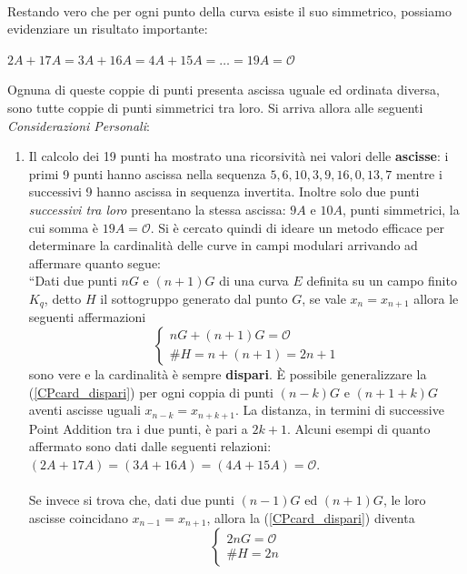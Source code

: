 \documentclass[a4paper,12pt]{tesiinfo}
\begin{document}
\\
Restando vero che per ogni punto della curva esiste il suo simmetrico, possiamo evidenziare un risultato importante:
\begin{center}
 $2A + 17A = 3A + 16A = 4A + 15A = \ldots = 19A = \mathcal{O}$
\end{center}
Ognuna di queste coppie di punti presenta ascissa uguale ed ordinata diversa, sono tutte coppie di punti simmetrici tra loro. Si arriva allora alle seguenti \textit{Considerazioni Personali}:
\begin{enumerate}
 \item Il calcolo dei 19 punti ha mostrato una ricorsivit\`a 
nei valori delle \textbf{ascisse}: i primi 9 punti hanno ascissa nella sequenza $5, 6, 10, 3, 9, 16, 0, 13, 7$ mentre i successivi 9 hanno ascissa in sequenza invertita. Inoltre solo due punti \textit{successivi tra loro} presentano la stessa ascissa: $9A$ e $10A$, punti simmetrici, la cui somma \`e $19A = \mathcal{O}$. Si \`e cercato quindi di ideare un metodo efficace per determinare la cardinalit\`a delle curve in campi modulari arrivando ad affermare quanto segue:
\\
``Dati due punti $nG$ e $(n+1)G$ di una curva $E$ definita su un campo finito $K_q$, detto $H$ il sottogruppo generato dal punto $G$, se vale $x_n = x_{n+1}$ allora le seguenti affermazioni
\begin{equation}
\begin{cases}
 nG + (n+1)G = \mathcal{O}\\
 \#H = n+(n+1) = 2n+1
\end{cases}
 \label{CPcard_dispari}
\end{equation}
 sono vere e la cardinalit\`a \`e sempre \textbf{dispari}. \`E possibile generalizzare la (\ref{CPcard_dispari}) per ogni coppia di punti $(n-k)G$ e $(n+1+k)G$ aventi ascisse uguali $x_{n-k} = x_{n+k+1}$. La distanza, in termini di successive Point Addition tra i due punti, \`e pari a $2k+1$. Alcuni esempi di quanto affermato sono dati dalle seguenti relazioni: $(2A + 17A)=(3A + 16A)=(4A + 15A)=\mathcal{O}$.
 \\
 \\
 Se invece si trova che, dati due punti $(n-1)G$ ed $(n+1)G$, le loro ascisse coincidano $x_{n-1} = x_{n+1}$, allora la (\ref{CPcard_dispari}) diventa
 \begin{equation}
\begin{cases}
 2nG = \mathcal{O}\\
 \#H =2n
\end{cases}

\end{equation}
\end{enumerate}
\end{document}
